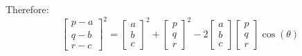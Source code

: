 \documentclass[11pt, a4paper]{article}
\begin{document}
Therefore:
\begin{equation*}
\begin{bmatrix} p-a \\ q-b \\ r-c \end{bmatrix}^{2}=\begin{bmatrix} a \\ b \\ c \end{bmatrix}^{2}+\begin{bmatrix} p \\ q \\ r \end{bmatrix}^{2}-2\begin{bmatrix} a \\ b \\ c \end{bmatrix}\begin{bmatrix} p \\ q \\ r \end{bmatrix}\cos(\theta)
\end{equation*}
\end{document}
